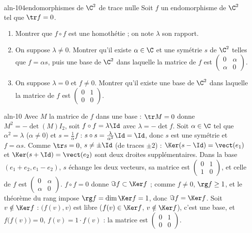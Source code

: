 \begin{exo}{aln-10}{4}{endomorphismes de $\C^2$ de trace nulle}
Soit $f$ un endomorphisme de $\C^2$ tel que $\tr f=0$.
\begin{enumerate}
\item Montrer que $f\circ f$ est une homothétie ; on note $\lambda$ son rapport.
\item On suppose $\lambda\neq0$. Montrer qu'il existe $\alpha\in\C$ et une symétrie $s$ de $\C^2$ telles que $f=\alpha s$, puis une base de
$\C^2$ dans laquelle la matrice de $f$ est $\begin{pmatrix}0&\alpha\\\alpha&0\end{pmatrix}$.
\item On suppose $\lambda=0$ et $f\neq0$. Montrer qu'il existe une base de $\C^2$ dans laquelle la matrice de $f$ est $\begin{pmatrix}0&1\\0&0\end{pmatrix}$.
\end{enumerate}
\end{exo}
\begin{corrige}{aln-10}
 Avec $M$ la matrice de $f$ dans une base : $\tr M=0$ donne $M^2=-\det(M)I_2$, soit $f\circ f=\lambda\Id$ avec $\lambda=-\det f$.
 Soit $\alpha\in\C$ tel que $\alpha^2=\lambda$ ($\alpha\neq0$) et $s=\frac1\alpha f$ : $s\circ s=\frac{\lambda}{\alpha^2}\Id=\Id$, donc
$s$ est une symétrie et $f=\alpha s$. Comme $\tr s=0$, $s\neq\pm\Id$ (de traces $\pm2$) : $\Ker(s-\Id)=\vect(e_1)$ et
$\Ker(s+\Id)=\vect(e_2)$ sont deux droites supplémentaires. Dans la base $(e_1+e_2,e_1-e_2)$, $s$ échange les deux vecteurs, sa matrice
est $\begin{pmatrix}0&1\\1&0\end{pmatrix}$, et celle de $f$ est $\begin{pmatrix}0&\alpha\\\alpha&0\end{pmatrix}$.
 $f\circ f=0$ donne $\Im f\subset\Ker f$ ; comme $f\neq0$, $\rg f\geq1$, et le théorème du rang impose $\rg f=\dim\Ker f=1$, donc
$\Im f=\Ker f$. Soit $v\notin\Ker f$ : $\big(f(v),v\big)$ est libre ($f(v)\in\Ker f$, $v\notin\Ker f$), c'est une base, et
$f\big(f(v)\big)=0$, $f(v)=1\cdot f(v)$ : la matrice est $\begin{pmatrix}0&1\\0&0\end{pmatrix}$.
\end{corrige}
